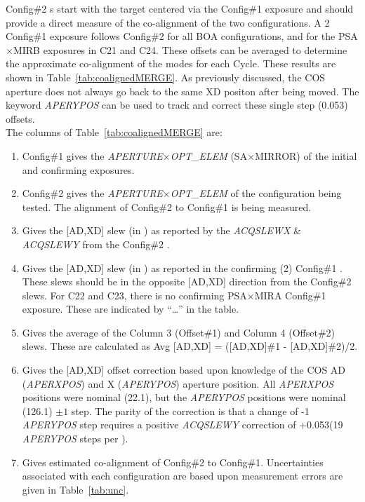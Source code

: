 Config\#2 s start with the target centered via the Config\#1 exposure and
should provide a direct measure of the co-alignment of the two configurations.
A 2 Config\#1 exposure follows Config\#2 for all BOA configurations, and for the PSA$\times$MIRB exposures in C21 and C24.
These offsets can be averaged to determine the approximate co-alignment of the modes for each Cycle.
These results are shown in Table~\ref{tab:coalignedMERGE}. As previously discussed, the COS aperture does not always go back to
the same XD positon after being moved. The keyword \textit{APERYPOS} can be used to track and correct these single step (0.053\arcsec) offsets.\\

The columns of Table~\ref{tab:coalignedMERGE} are:
\footnotesize
\begin{enumerate}
\item Config\#1 gives the \textit{APERTURE}$\times$\textit{OPT\_ELEM} (SA$\times$MIRROR) of the initial and confirming  exposures.
\item Config\#2 gives the \textit{APERTURE}$\times$\textit{OPT\_ELEM} of the  configuration being tested. The alignment of Config\#2 to
Config\#1 is being measured.
\item Gives the [AD,XD] slew (in \arcsec) as reported by the \textit{ACQSLEWX} \& \textit{ACQSLEWY} from the Config\#2 .
\item Gives the [AD,XD] slew (in \arcsec) as reported in the confirming (2) Config\#1 . These slews should be in the opposite [AD,XD]
direction from the Config\#2 slews. For C22 and C23, there is no confirming PSA$\times$MIRA Config\#1 exposure. These are indicated by ``\dots'' in the table.
\item Gives the average of the Column 3 (Offset\#1) and Column 4 (Offset\#2) slews. These are calculated as Avg [AD,XD] = ([AD,XD]\#1 - [AD,XD]\#2)/2.
\item Gives the [AD,XD] offset correction based upon knowledge of the COS AD (\textit{APERXPOS}) and X (\textit{APERYPOS}) aperture position.
All \textit{APERXPOS} positions were nominal (22.1), but the \textit{APERYPOS} positions were nominal (126.1) $\pm 1$ step. The parity of the correction is that a change of -1 \textit{APERYPOS} step requires a positive
\textit{ACQSLEWY} correction of +0.053\arcsec{}(19 \textit{APERYPOS} steps per \arcsec).
\item Gives estimated co-alignment of Config\#2 to Config\#1. Uncertainties associated with each  configuration are based upon measurement errors are given in Table~\ref{tab:unc}.
\end{enumerate}
\normalsize

